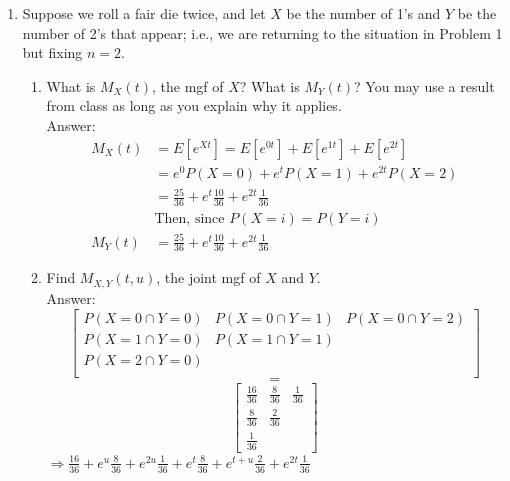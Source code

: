 \documentclass{article}
\begin{document}
\begin{enumerate}
\begin{enumerate}
                \\Answer:\\
                Told to not complete since answer wasn't posted.
        \end{enumerate}
    \clearpage
    \item   Suppose we roll a fair die twice, and let $X$ be the number of 1's and $Y$ be the number of 2's that appear;
            i.e., we are returning to the situation in Problem 1 but fixing $n=2$.
        \begin{enumerate}
            \item   What is $M_X(t)$, the mgf of $X$? What is $M_Y(t)$? You may use a result from class as long as you
                    explain why it applies.
                \\Answer:
                \begin{align*}
                    M_X(t) &= E[e^{Xt}]=E[e^{0t}]+E[e^{1t}]+E[e^{2t}]\\
                           &= e^0P(X=0) + e^t P(X=1) + e^{2t}P(X=2)\\
                           &= \frac{25}{36} + e^t\frac{10}{36} + e^{2t}\frac{1}{36} \\
                           &\text{Then, since $P(X=i) = P(Y=i)$}\\
                    M_Y(t) &= \frac{25}{36} + e^t\frac{10}{36} + e^{2t}\frac{1}{36}
                \end{align*}
            \item   Find $M_{X,Y}(t,u)$, the joint mgf of $X$ and $Y$.
                \\Answer:
                $$
                \begin{bmatrix}
                    P(X=0\cap Y=0)& P(X=0\cap Y=1)& P(X=0\cap Y=2)\\
                    P(X=1\cap Y=0)& P(X=1\cap Y=1)\\
                    P(X=2\cap Y=0)\\
                \end{bmatrix}
                $$
                $$=$$
                $$
                \begin{bmatrix}
                    \frac{16}{36}&\frac{8}{36}&\frac{1}{36}\\
                    \frac{8}{36} & \frac{2}{36} \\
                    \frac{1}{36}
                \end{bmatrix}
                $$
                $\Rightarrow\frac{16}{36} + e^u\frac{8}{36}+e^{2u}\frac{1}{36}+e^t\frac{8}{36}+e^{t+u}\frac{2}{36}+e^{2t}\frac{1}{36}$

\end{enumerate}
\end{enumerate}
\end{document}
